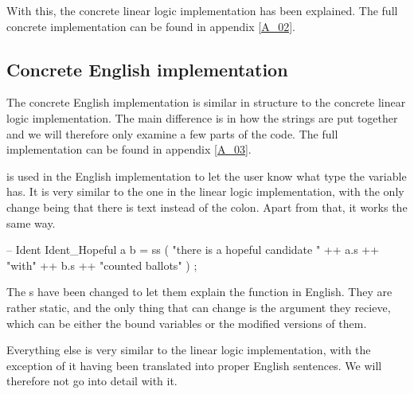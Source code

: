 With this, the concrete linear logic implementation has been explained. The full concrete implementation can be found in appendix \ref{A_02}.

\subsection{Concrete English implementation}
\label{04_02_02}

The concrete English implementation is similar in structure to the concrete linear logic implementation. The main difference is in how the strings are put together and we will therefore only examine a few parts of the code. The full implementation can be found in appendix \ref{A_03}.


 is used in the English implementation to let the user know what type the variable has. It is very similar to the one in the linear logic implementation, with the only change being that there is text instead of the colon. Apart from that, it works the same way.

\begin{lstgf}
        -- Ident
        Ident_Hopeful a b
            = ss ( "there is a hopeful candidate " ++ a.s ++ "with" ++ b.s ++ "counted ballots" ) ;
\end{lstgf}

The s have been changed to let them explain the function in English. They are rather static, and the only thing that can change is the argument they recieve, which can be either the bound variables or the modified versions of them.

Everything else is very similar to the linear logic implementation, with the exception of it having been translated into proper English sentences. We will therefore not go into detail with it.

\\
